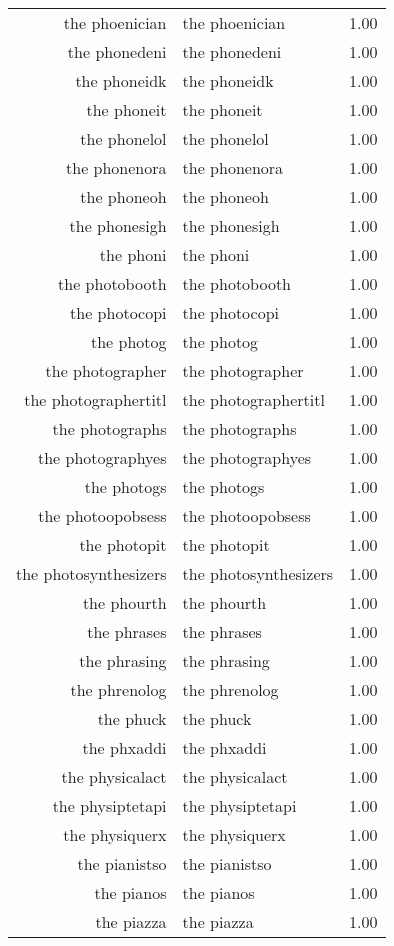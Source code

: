 \begin{table}[ht]
\begin{tabular}{rlr}
  the phoenician & the phoenician & 1.00 \\ 
  the phonedeni & the phonedeni & 1.00 \\ 
  the phoneidk & the phoneidk & 1.00 \\ 
  the phoneit & the phoneit & 1.00 \\ 
  the phonelol & the phonelol & 1.00 \\ 
  the phonenora & the phonenora & 1.00 \\ 
  the phoneoh & the phoneoh & 1.00 \\ 
  the phonesigh & the phonesigh & 1.00 \\ 
  the phoni & the phoni & 1.00 \\ 
  the photobooth & the photobooth & 1.00 \\ 
  the photocopi & the photocopi & 1.00 \\ 
  the photog & the photog & 1.00 \\ 
  the photographer & the photographer & 1.00 \\ 
  the photographertitl & the photographertitl & 1.00 \\ 
  the photographs & the photographs & 1.00 \\ 
  the photographyes & the photographyes & 1.00 \\ 
  the photogs & the photogs & 1.00 \\ 
  the photoopobsess & the photoopobsess & 1.00 \\ 
  the photopit & the photopit & 1.00 \\ 
  the photosynthesizers & the photosynthesizers & 1.00 \\ 
  the phourth & the phourth & 1.00 \\ 
  the phrases & the phrases & 1.00 \\ 
  the phrasing & the phrasing & 1.00 \\ 
  the phrenolog & the phrenolog & 1.00 \\ 
  the phuck & the phuck & 1.00 \\ 
  the phxaddi & the phxaddi & 1.00 \\ 
  the physicalact & the physicalact & 1.00 \\ 
  the physiptetapi & the physiptetapi & 1.00 \\ 
  the physiquerx & the physiquerx & 1.00 \\ 
  the pianistso & the pianistso & 1.00 \\ 
  the pianos & the pianos & 1.00 \\ 
  the piazza & the piazza & 1.00 \\ 

\end{tabular}
\end{table}
